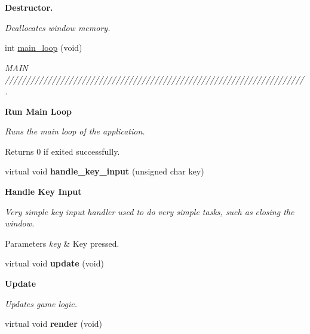 \begin{Indent}{\bf Destructor.}\par
{\em Deallocates window memory. }\begin{DoxyCompactItemize}
\item 
\hypertarget{classngl_1_1gl_application_a9fc7999a5326225c19ba97dd48928732}{}int \hyperlink{classngl_1_1gl_application_a9fc7999a5326225c19ba97dd48928732}{main\+\_\+loop} (void)\label{classngl_1_1gl_application_a9fc7999a5326225c19ba97dd48928732}

\begin{DoxyCompactList}\small\item\em M\+A\+I\+N //////////////////////////////////////////////////////////////////////. \end{DoxyCompactList}\end{DoxyCompactItemize}
\end{Indent}
\begin{Indent}{\bf Run Main Loop}\par
{\em Runs the main loop of the application.

\begin{DoxyReturn}{Returns}
0 if exited successfully. 
\end{DoxyReturn}
}\begin{DoxyCompactItemize}
\item 
\hypertarget{classngl_1_1gl_application_a0d16edce4bfa7ad4daa87b43f1f64a77}{}virtual void {\bfseries handle\+\_\+key\+\_\+input} (unsigned char key)\label{classngl_1_1gl_application_a0d16edce4bfa7ad4daa87b43f1f64a77}

\end{DoxyCompactItemize}
\end{Indent}
\begin{Indent}{\bf Handle Key Input}\par
{\em Very simple key input handler used to do very simple tasks, such as closing the window.


\begin{DoxyParams}{Parameters}
{\em key} & Key pressed. \\
\hline
\end{DoxyParams}
}\begin{DoxyCompactItemize}
\item 
\hypertarget{classngl_1_1gl_application_a887d4a31d4c04488746867559ccfe0a3}{}virtual void {\bfseries update} (void)\label{classngl_1_1gl_application_a887d4a31d4c04488746867559ccfe0a3}

\end{DoxyCompactItemize}
\end{Indent}
\begin{Indent}{\bf Update}\par
{\em Updates game logic. }\begin{DoxyCompactItemize}
\item 
\hypertarget{classngl_1_1gl_application_a65a4f466a2393ed9066881ed2591df6c}{}virtual void {\bfseries render} (void)\label{classngl_1_1gl_application_a65a4f466a2393ed9066881ed2591df6c}

\end{DoxyCompactItemize}
\end{Indent}
